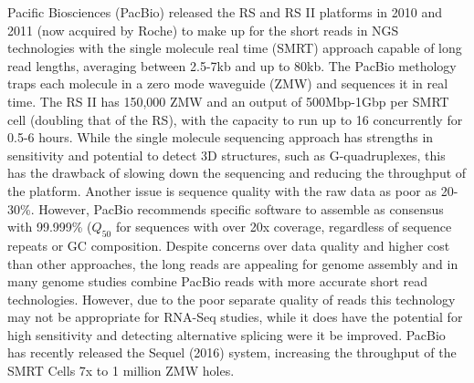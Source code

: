 Pacific Biosciences (PacBio) released the RS and RS II platforms in 2010 and 2011 (now acquired by Roche) to make up for the short reads in NGS technologies with the single molecule real time (SMRT) approach capable of long read lengths, averaging between 2.5-7kb and up to 80kb. The PacBio methology traps each molecule in a zero mode waveguide (ZMW) and sequences it in real time. The RS II has 150,000 ZMW and an output of 500Mbp-1Gbp per SMRT cell (doubling that of the RS), with the capacity to run up to 16 concurrently for 0.5-6 hours. While the single molecule sequencing approach has strengths in sensitivity and potential to detect 3D structures, such as G-quadruplexes, this has the drawback of slowing down the sequencing and reducing the throughput of the platform. Another issue is sequence quality with the raw data as poor as 20-30\%. However, PacBio recommends specific software to assemble as consensus with 99.999\% ($Q_{50}$ for sequences with over 20x coverage, regardless of sequence repeats or GC composition. Despite concerns over data quality and higher cost than other approaches, the long reads are appealing for genome assembly and in many genome studies combine PacBio reads with more accurate short read technologies. However, due to the poor separate quality of reads this technology may not be appropriate for RNA-Seq studies, while it does have the potential for high sensitivity and detecting alternative splicing were it be improved. PacBio has recently released the Sequel (2016) system, increasing the throughput of the SMRT Cells 7x to 1 million ZMW holes. 

